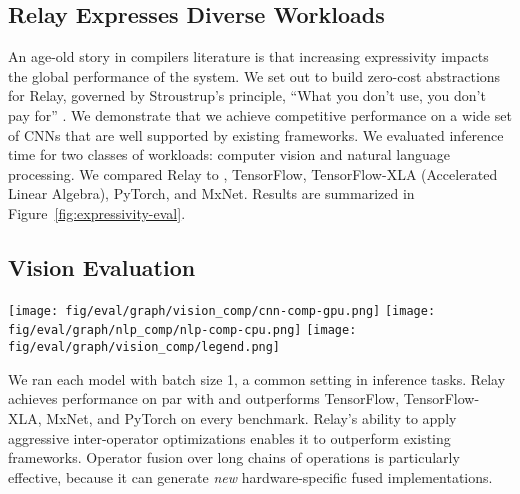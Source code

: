 \subsection{Relay Expresses Diverse Workloads}
\label{sec:perf-gpu}

An age-old story in compilers literature is that increasing expressivity
  impacts the global performance of the system.
We set out to build zero-cost abstractions for Relay,
  governed by Stroustrup's principle, ``What you don't use, you don't pay
  for'' \citep{bjarne}.
We demonstrate that we achieve competitive performance on a wide set of CNNs that are well supported by existing frameworks.
We evaluated inference time for two classes of workloads: computer vision and natural language processing.
We compared Relay to \nnvm,
  TensorFlow, TensorFlow-XLA (Accelerated Linear Algebra), PyTorch, and MxNet.
Results are summarized in Figure~\ref{fig:expressivity-eval}.

\subsection*{Vision Evaluation}

\begin{figure*}[htbp!]
  \centering
  \texttt{[image: fig/eval/graph/vision\_comp/cnn-comp-gpu.png]}
  \texttt{[image: fig/eval/graph/nlp\_comp/nlp-comp-cpu.png]}
  \texttt{[image: fig/eval/graph/vision\_comp/legend.png]}
  \caption{\textmd{
    Inference speedup of Relay relative to popular frameworks
      on vision and NLP benchmarks.
    The vision benchmarks used an NVIDIA Titan-V GPU, and the NLP benchmarks ran on CPU only.
    We ran 1000 trials for each model, except for CharRNN, on which we used 100 trials.
    Relay matches the performance of NNVM on vision but additionally supports NLP,
      where Relay provides performance competitive to the state of the art (up to
        2.3$\times$ speedup over MxNet on GRU).
  }}
  \label{fig:expressivity-eval}
\end{figure*}

We ran each model with
  batch size 1, a common setting in inference tasks.
Relay achieves performance on par with \nnvm
  and outperforms TensorFlow, TensorFlow-XLA, MxNet, and
  PyTorch on every benchmark.
Relay's ability to apply aggressive inter-operator optimizations
  enables it to outperform existing frameworks.
Operator fusion over long chains of operations is particularly effective,
  because it can generate \textit{new} hardware-specific fused implementations.

